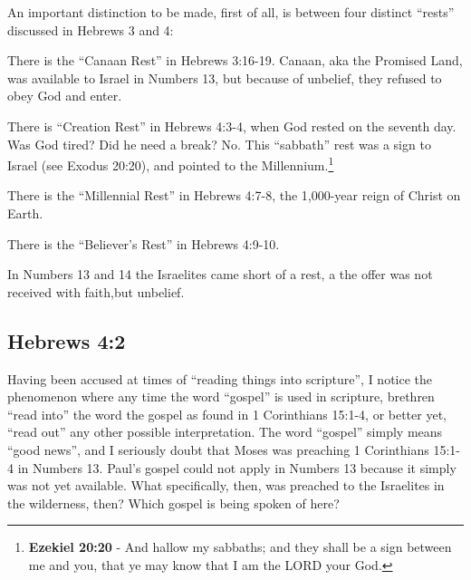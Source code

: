 An important distinction to be made, first of all, is between four distinct ``rests'' discussed in Hebrews 3 and 4:
\begin{compactenum}
	\item There is the ``Canaan Rest'' in Hebrews 3:16-19.  Canaan, aka the Promised Land, was available to Israel in Numbers 13, but because of unbelief, they refused to obey God and enter.
	\item There is ``Creation Rest'' in Hebrews 4:3-4, when God rested on the seventh day. Was God tired? Did he need a break? No. This ``sabbath'' rest was a sign to Israel (see Exodus 20:20), and pointed to the Millennium.\footnote{\textbf{Ezekiel 20:20} - And hallow my sabbaths; and they shall be a sign between me and you, that ye may know that I am the LORD your God.}
	\item There is the ``Millennial Rest'' in Hebrews 4:7-8, the 1,000-year reign of Christ on Earth.
	\item There is the ``Believer's Rest'' in Hebrews 4:9-10. 
\end{compactenum}
In Numbers 13 and 14 the Israelites came short of a rest, a the offer was not received with faith,but unbelief.


\subsection{Hebrews 4:2}
Having been accused at times of ``reading things into scripture'', I notice the phenomenon where any time the word ``gospel'' is used in scripture, brethren ``read into'' the word the gospel as found in 1 Corinthians 15:1-4, or better yet, ``read out'' any other possible interpretation.  The word ``gospel'' simply means  ``good news'', and I seriously doubt that Moses was preaching 1 Corinthians 15:1-4 in Numbers 13.  Paul's gospel could not apply in Numbers 13 because it simply was not yet available. What specifically, then, was preached to the Israelites in the wilderness, then? Which gospel is being spoken of here?

